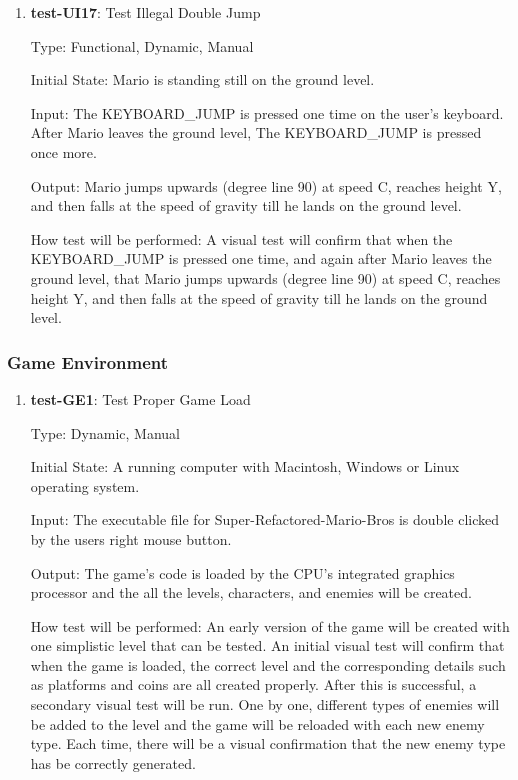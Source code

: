 \documentclass[12pt, titlepage]{article}
\begin{document}
\begin{enumerate}
\item{\textbf{test-UI17}: Test Illegal Double Jump\\}

Type: Functional, Dynamic, Manual
					
Initial State: Mario is standing still on the ground level.
					
Input: The KEYBOARD\_JUMP is pressed one time on the user's keyboard. After Mario leaves the ground level, The KEYBOARD\_JUMP is pressed once more.
					
Output: Mario jumps upwards (degree line 90) at speed C, reaches height Y, and then falls at the speed of gravity till he lands on the ground level.
					
How test will be performed: A visual test will confirm that when the KEYBOARD\_JUMP is pressed one time, and again after Mario leaves the ground level, that Mario jumps upwards (degree line 90) at speed C, reaches height Y, and then falls at the speed of gravity till he lands on the ground level.

\end{enumerate}

\subsubsection{Game Environment}

\begin{enumerate}

\item{\textbf{test-GE1}: Test Proper Game Load\\}

Type: Dynamic, Manual
					
Initial State: A running computer with Macintosh, Windows or Linux operating system.
					
Input: The executable file for Super-Refactored-Mario-Bros is double clicked by the users right mouse button.
					
Output: The game's code is loaded by the CPU's integrated graphics processor and the all the levels, characters, and enemies will be created. 
					
How test will be performed: An early version of the game will be created with one simplistic level that can be tested. An initial visual test will confirm that when the game is loaded, the correct level and the corresponding details such as platforms and coins are all created properly. After this is successful, a secondary visual test will be run. One by one, different types of enemies will be added to the level and the game will be reloaded with each new enemy type. Each time, there will be a visual confirmation that the new enemy type has be correctly generated.

\end{enumerate}
\end{document}
